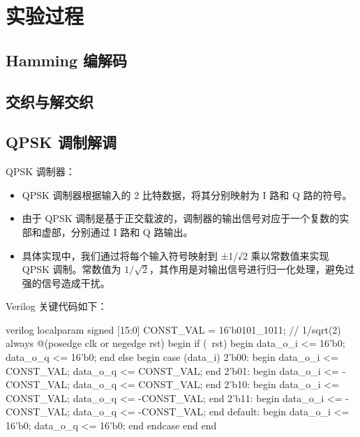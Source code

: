 \section{实验过程}

\subsection{Hamming 编解码}



\subsection{交织与解交织}



\subsection{QPSK 调制解调}

QPSK 调制器：

\begin{itemize} 
    \item QPSK 调制器根据输入的 2 比特数据，将其分别映射为 I 路和 Q 路的符号。
    \item 由于 QPSK 调制是基于正交载波的，调制器的输出信号对应于一个复数的实部和虚部，分别通过 I 路和 Q 路输出。
    \item 具体实现中，我们通过将每个输入符号映射到 ±1/√2 乘以常数值来实现 QPSK 调制。常数值为 $1/\sqrt{2}$，其作用是对输出信号进行归一化处理，避免过强的信号造成干扰。
\end{itemize}

Verilog 关键代码如下：

\begin{codeblock}{verilog}
localparam signed [15:0] CONST_VAL = 16'b0101_1011;  // 1/sqrt(2)
always @(posedge clk or negedge rst) begin
    if (~rst) begin
        data_o_i <= 16'b0;  data_o_q <= 16'b0;
    end else begin
        case (data_i)
            2'b00: begin
                data_o_i <= CONST_VAL;  data_o_q <= CONST_VAL;
            end
            2'b01: begin
                data_o_i <= -CONST_VAL; data_o_q <= CONST_VAL;
            end
            2'b10: begin
                data_o_i <= CONST_VAL;  data_o_q <= -CONST_VAL;
            end
            2'b11: begin
                data_o_i <= -CONST_VAL; data_o_q <= -CONST_VAL;
            end
            default: begin
                data_o_i <= 16'b0;      data_o_q <= 16'b0;
            end
        endcase
    end
end
\end{codeblock}

